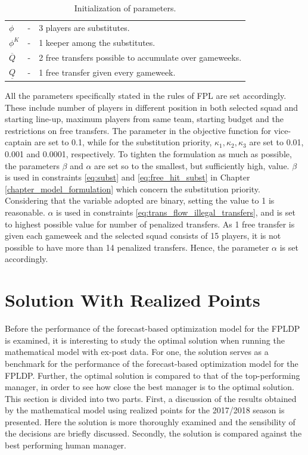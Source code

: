 \begin{table}[H]
\begin{tabular}{@{}lll@{}}
$\phi$                           & - & 3 players are substitutes.                                                         \\
$\phi^{K}$                       & - & 1 keeper among the substitutes.                                                          \\
$\overline{Q}$                   & - & 2 free transfers possible to accumulate over gameweeks.                                              \\
$\underline{Q}$                  & - & 1 free transfer given every gameweek.                                      \\ \bottomrule
\end{tabular}
\caption{Initialization of parameters.}
\label{tab:initialization_of_parameters}
\end{table}


All the parameters specifically stated in the rules of FPL are set accordingly. These include number of players in different position in both selected squad and starting line-up, maximum players from same team, starting budget and the restrictions on free transfers. The parameter in the objective function for vice-captain are set to 0.1, while for the substitution priority, $\kappa_{1}, \kappa_{2}, \kappa_{3}$ are set to 0.01, 0.001 and 0.0001, respectively. To tighten the formulation as much as possible, the parameters $\beta$ and $\alpha$ are set so to the smallest, but sufficiently high, value. $\beta$ is used in constraints \eqref{eq:subst} and \eqref{eq:free_hit_subst} in Chapter \ref{chapter_model_formulation} which concern the substitution priority. Considering that the variable adopted are binary, setting the value to 1 is reasonable. $\alpha$ is used in constraints \eqref{eq:trans_flow_illegal_transfers}, and is set to highest possible value for number of penalized transfers. As 1 free transfer is given each gameweek and the selected squad consists of 15 players, it is not possible to have more than 14 penalized transfers. Hence, the parameter $\alpha$ is set accordingly. 


\section{Solution With Realized Points}\label{sec:exact}

Before the performance of the forecast-based optimization model for the FPLDP is examined, it is interesting to study the optimal solution when running the mathematical model with ex-post data. For one, the solution serves as a benchmark for the performance of the forecast-based optimization model for the FPLDP. Further, the optimal solution is compared to that of the top-performing manager, in order to see how close the best manager is to the optimal solution. This section is divided into two parts. First, a discussion of the results obtained by the mathematical model using realized points for the 2017/2018 season is presented. Here the solution is more thoroughly examined and the sensibility of the decisions are briefly discussed. Secondly, the solution is compared against the best performing human manager.

